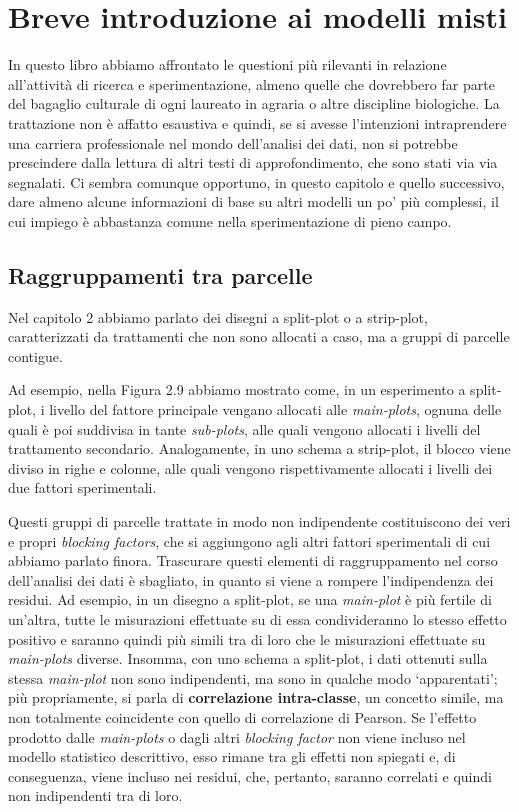 \documentclass[a4paper,12pt,oneside]{book}
\begin{document}
\hypertarget{breve-introduzione-ai-modelli-misti}{%
\chapter{Breve introduzione ai modelli misti}\label{breve-introduzione-ai-modelli-misti}}

In questo libro abbiamo affrontato le questioni più rilevanti in relazione all'attività di ricerca e sperimentazione, almeno quelle che dovrebbero far parte del bagaglio culturale di ogni laureato in agraria o altre discipline biologiche. La trattazione non è affatto esaustiva e quindi, se si avesse l'intenzioni intraprendere una carriera professionale nel mondo dell'analisi dei dati, non si potrebbe prescindere dalla lettura di altri testi di approfondimento, che sono stati via via segnalati. Ci sembra comunque opportuno, in questo capitolo e quello successivo, dare almeno alcune informazioni di base su altri modelli un po' più complessi, il cui impiego è abbastanza comune nella sperimentazione di pieno campo.

\hypertarget{raggruppamenti-tra-parcelle}{%
\section{Raggruppamenti tra parcelle}\label{raggruppamenti-tra-parcelle}}

Nel capitolo 2 abbiamo parlato dei disegni a split-plot o a strip-plot, caratterizzati da trattamenti che non sono allocati a caso, ma a gruppi di parcelle contigue.

Ad esempio, nella Figura 2.9 abbiamo mostrato come, in un esperimento a split-plot, i livello del fattore principale vengano allocati alle \emph{main-plots}, ognuna delle quali è poi suddivisa in tante \emph{sub-plots}, alle quali vengono allocati i livelli del trattamento secondario. Analogamente, in uno schema a strip-plot, il blocco viene diviso in righe e colonne, alle quali vengono rispettivamente allocati i livelli dei due fattori sperimentali.

Questi gruppi di parcelle trattate in modo non indipendente costituiscono dei veri e propri \emph{blocking factors}, che si aggiungono agli altri fattori sperimentali di cui abbiamo parlato finora. Trascurare questi elementi di raggruppamento nel corso dell'analisi dei dati è sbagliato, in quanto si viene a rompere l'indipendenza dei residui. Ad esempio, in un disegno a split-plot, se una \emph{main-plot} è più fertile di un'altra, tutte le misurazioni effettuate su di essa condivideranno lo stesso effetto positivo e saranno quindi più simili tra di loro che le misurazioni effettuate su \emph{main-plots} diverse. Insomma, con uno schema a split-plot, i dati ottenuti sulla stessa \emph{main-plot} non sono indipendenti, ma sono in qualche modo `apparentati'; più propriamente, si parla di \textbf{correlazione intra-classe}, un concetto simile, ma non totalmente coincidente con quello di correlazione di Pearson. Se l'effetto prodotto dalle \emph{main-plots} o dagli altri \emph{blocking factor} non viene incluso nel modello statistico descrittivo, esso rimane tra gli effetti non spiegati e, di conseguenza, viene incluso nei residui, che, pertanto, saranno correlati e quindi non indipendenti tra di loro.
\end{document}
